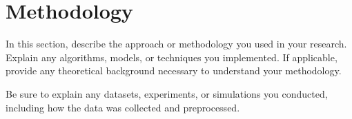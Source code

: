 \section{Methodology}

In this section, describe the approach or methodology you used in your research. Explain any algorithms, models, or techniques you implemented. If applicable, provide any theoretical background necessary to understand your methodology.

Be sure to explain any datasets, experiments, or simulations you conducted, including how the data was collected and preprocessed.

